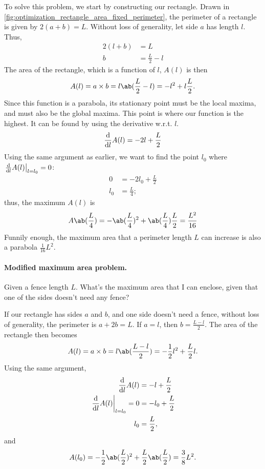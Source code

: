 To solve this problem, we start by constructing our rectangle. Drawn in \cref{fig:optimization_rectangle_area_fixed_perimeter}, the perimeter of a rectangle is given by $2(a + b) = L$. Without loss of generality, let side $a$ has length $l$. Thus,
\begin{align}
  2(l + b) & = L               \\
  b        & = \frac{L}{2} - l
\end{align}
The area of the rectangle, which is a function of $l$, $A(l)$ is then
\begin{equation}
  A(l) = a \times b = l\ab(\frac{L}{2} - l) = -l^2 + l\frac{L}{2}.
\end{equation}
Since this function is a parabola, its stationary point must be the local maxima, and must also be the global maxima. This point is where our function is the highest. It can be found by using the derivative w.r.t. $l$.
\begin{equation}
  \odv*{A(l)}{l} = -2l + \frac{L}{2}
\end{equation}
Using the same argument as earlier, we want to find the point $l_0$ where $\odv*{A(l)}{l}_{l = l_0} = 0$:
\begin{align}
  0   & = - 2l_0 + \frac{L}{2} \\
  l_0 & = \frac{L}{4};
\end{align}
thus, the maximum $A(l)$ is
\begin{equation}
  A\ab(\frac{L}{4}) = -\ab(\frac{L}{4})^2 + \ab(\frac{L}{4})\frac{L}{2} = \frac{L^2}{16}
\end{equation}
Funnily enough, the maximum area that a perimeter length $L$ can increase is also a parabola $\frac{1}{16}L^2$.

\paragraph{Modified maximum area problem.} Given a fence length $L$. What's the maximum area that I can enclose, given that one of the sides doesn't need any fence?

If our rectangle has sides $a$ and $b$, and one side doesn't need a fence, without loss of generality, the perimeter is $a + 2b = L$. If $a = l$, then $b = \frac{L - l}{2}$. The area of the rectangle then becomes
\begin{equation}
  A(l) = a \times b = l\ab(\frac{L - l}{2}) = - \frac{1}{2}l^2 + \frac{L}{2}l.
\end{equation}
Using the same argument,
\begin{align}
  \odv*{A(l)}{l}               & = -l + \frac{L}{2}   \\
  \odv*{A(l)}{l}_{l = l_0} = 0 & = -l_0 + \frac{L}{2} \\
  l_0                          & = \frac{L}{2},
\end{align}
and
\begin{align}
  A(l_0) = -\frac{1}{2}\ab(\frac{L}{2})^2 + \frac{L}{2}\ab(\frac{L}{2}) = \frac{3}{8}L^2.
\end{align}

